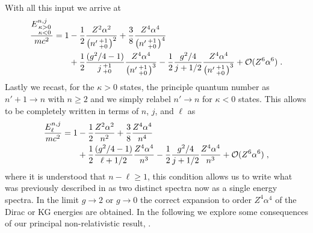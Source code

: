 With all this input we arrive at
\begin{alignat}{1}
\label{nonrel04} \frac{E^{n,j}_{\begin{smallmatrix}
\kappa>0 \\ \kappa<0
\end{smallmatrix}}}{mc^{2}}=1&-\frac{1}{2}\frac{Z^{2}\alpha^{2}}{\left(n'\begin{smallmatrix}
+1 \\ +0
\end{smallmatrix}\right)^{2}}+\frac{3}{8}\frac{Z^{4}\alpha^{4}}{\left(n'\begin{smallmatrix}
+1 \\ +0
\end{smallmatrix}\right)^{4}}
\\ \notag &+\frac{1}{2}
\frac{(g^{2}/4-1)}{j\begin{smallmatrix}
+1 \\ +0
\end{smallmatrix}}\frac{Z^{4}\alpha^{4}}{\left(n'\begin{smallmatrix}
+1 \\ +0
\end{smallmatrix}\right)^{3}}-\frac{1}{2}\frac{g^{2}/4}{j+1/2}\frac{Z^{4}\alpha^{4}}{\left(n'\begin{smallmatrix}
+1 \\ +0
\end{smallmatrix}\right)^{3}}+\mathcal{O}(Z^{6}\alpha^{6})\;.
\end{alignat}
Lastly we recast, for the $\kappa>0$ states, the principle quantum number as $n'+1\rightarrow n$ with $n\geq2$ and we simply relabel $n'\rightarrow n$ for $\kappa<0$ states. This allows  to be completely written in terms of $n$, $j$, and $\ell$ as
\begin{alignat}{1}
\label{nonrel09} \frac{E^{n,j}_{\ell}}{mc^{2}}=1&-\frac{1}{2}\frac{Z^{2}\alpha^{2}}{n^{2}}+\frac{3}{8}\frac{Z^{4}\alpha^{4}}{n^{4}}\\
\notag &+\frac{1}{2}\frac{(g^{2}/4-1)}{\ell+1/2}\frac{Z^{4}\alpha^{4}}{n^{3}}-\frac{1}{2}\frac{g^{2}/4}{j+1/2}\frac{Z^{4}\alpha^{4}}{n^{3}}+\mathcal{O}(Z^{6}\alpha^{6})\;,\end{alignat}
where it is understood that $n-\ell\geq1$, this condition allows us to write what was previously described in  as two distinct spectra now as a single energy spectra. In the limit $g\rightarrow2$ or $g\rightarrow0$ the correct expansion to order $Z^{4}\alpha^4$ of the Dirac or KG energies are obtained. In the following we explore some consequences of our principal non-relativistic result, .


